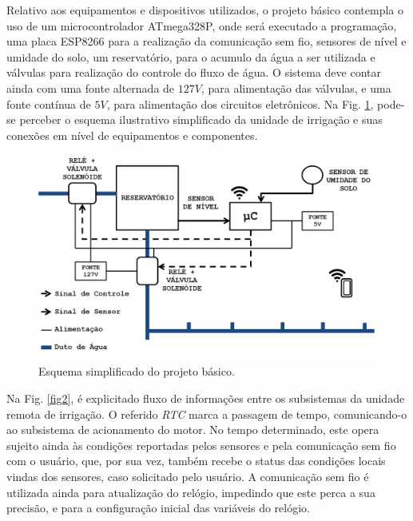 \documentclass[conference]{IEEEtran}
\begin{document}
Relativo aos equipamentos e dispositivos utilizados, o projeto básico contempla o uso de um microcontrolador ATmega328P,  onde será executado a programação, uma placa ESP8266 para a realização da comunicação sem fio, sensores de nível e umidade do solo, um reservatório, para o acumulo da água a ser utilizada e válvulas para realização do controle do fluxo de água. O sistema deve contar ainda com uma fonte alternada de $127 V$, para alimentação das válvulas, e uma fonte contínua de $5 V$, para alimentação dos circuitos eletrônicos. Na Fig. \ref{fig1}, pode-se perceber o esquema ilustrativo simplificado da unidade de irrigação e suas conexões em nível de equipamentos e componentes.

\begin{figure}[htbp]
\centerline{\includegraphics[angle=0, scale=.2]{images/Img1.png}}
\caption{Esquema simplificado do projeto básico.}
\label{fig1}
\end{figure}

Na Fig. \ref{fig2}, é explicitado fluxo de informações entre os subsistemas da unidade remota de irrigação. O referido \textit{RTC} marca a passagem de tempo, comunicando-o ao subsistema de acionamento do motor. No tempo determinado, este opera sujeito ainda às condições reportadas pelos sensores e pela comunicação sem fio com o usuário, que, por sua vez, também recebe o status das condições locais vindas dos sensores, caso solicitado pelo usuário. A comunicação sem fio é utilizada ainda para atualização do relógio, impedindo que este perca a sua precisão, e para a configuração inicial das variáveis do relógio.
\end{document}
